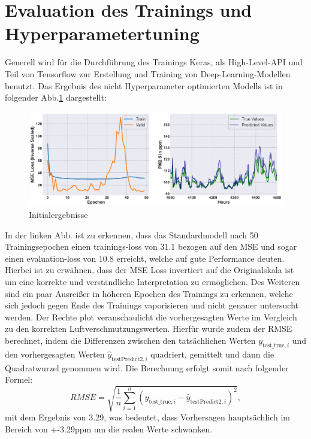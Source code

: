 \documentclass{article}
\begin{document}
\section{Evaluation des Trainings und Hyperparametertuning}
Generell wird für die Durchführung des Trainings Keras, als High-Level-API und Teil von Tensorflow zur Erstellung und Training von Deep-Learning-Modellen benutzt.
Das Ergebnis des nicht Hyperparameter optimierten Modells ist in folgender Abb.\ref{fig:ergebnis_vor} dargestellt:
\begin{figure}[H]
  \centering
  \includegraphics[width=1\textwidth]{output.png}
  \caption{Initialergebnisse}
  \label{fig:ergebnis_vor}
\end{figure}
In der linken Abb. ist zu erkennen, dass das Standardmodell nach 50 Trainingsepochen einen trainings-loss von 31.1 bezogen auf den MSE und sogar einen evaluation-loss von 10.8 erreicht, welche auf gute Performance deuten.
Hierbei ist zu erwähnen, dass der MSE Loss invertiert auf die Originalskala ist um eine korrekte und verständliche Interpretation zu ermöglichen. 
Des Weiteren sind ein paar Ausreißer in höheren Epochen des Trainings zu erkennen, welche sich jedoch gegen Ende des Trainings vaporisieren und nicht genauer untersucht werden.
Der Rechte plot veranschaulicht die vorhergesagten Werte im Vergleich zu den korrekten Luftverschmutzungswerten.
Hierfür wurde zudem der RMSE berechnet, indem die Differenzen zwischen den tatsächlichen Werten \(y_{\text{test\_true},i}\) und den vorhergesagten Werten \(\hat{y}_{\text{testPredict2},i}\) quadriert, gemittelt und dann die Quadratwurzel genommen wird.
Die Berechnung erfolgt somit nach folgender Formel:
\begin{equation}
RMSE = \sqrt{\frac{1}{n} \sum_{i=1}^{n} (y_{\text{test\_true},i} - \hat{y}_{\text{testPredict2},i})^2},
\end{equation}
mit dem Ergebnis von 3.29, was bedeutet, dass Vorhersagen hauptsächlich im Bereich von +-3.29ppm um die realen Werte schwanken. 
\end{document}

